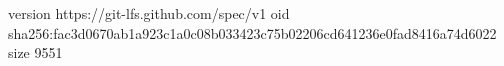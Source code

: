 version https://git-lfs.github.com/spec/v1
oid sha256:fac3d0670ab1a923c1a0c08b033423c75b02206cd641236e0fad8416a74d6022
size 9551
